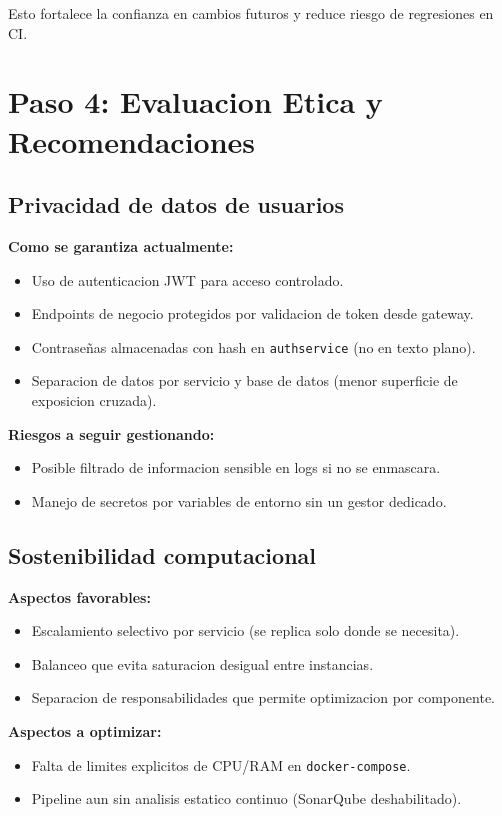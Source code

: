 \documentclass[12pt,a4paper]{article}
\begin{document}
Esto fortalece la confianza en cambios futuros y reduce riesgo de regresiones en CI.

\section{Paso 4: Evaluacion Etica y Recomendaciones}
\subsection{Privacidad de datos de usuarios}
\textbf{Como se garantiza actualmente:}
\begin{itemize}[leftmargin=*]
    \item Uso de autenticacion JWT para acceso controlado.
    \item Endpoints de negocio protegidos por validacion de token desde gateway.
    \item Contraseñas almacenadas con hash en \texttt{authservice} (no en texto plano).
    \item Separacion de datos por servicio y base de datos (menor superficie de exposicion cruzada).
\end{itemize}

\textbf{Riesgos a seguir gestionando:}
\begin{itemize}[leftmargin=*]
    \item Posible filtrado de informacion sensible en logs si no se enmascara.
    \item Manejo de secretos por variables de entorno sin un gestor dedicado.
\end{itemize}

\subsection{Sostenibilidad computacional}
\textbf{Aspectos favorables:}
\begin{itemize}[leftmargin=*]
    \item Escalamiento selectivo por servicio (se replica solo donde se necesita).
    \item Balanceo que evita saturacion desigual entre instancias.
    \item Separacion de responsabilidades que permite optimizacion por componente.
\end{itemize}

\textbf{Aspectos a optimizar:}
\begin{itemize}[leftmargin=*]
    \item Falta de limites explicitos de CPU/RAM en \texttt{docker-compose}.
    \item Pipeline aun sin analisis estatico continuo (SonarQube deshabilitado).
\end{itemize}
\end{document}
